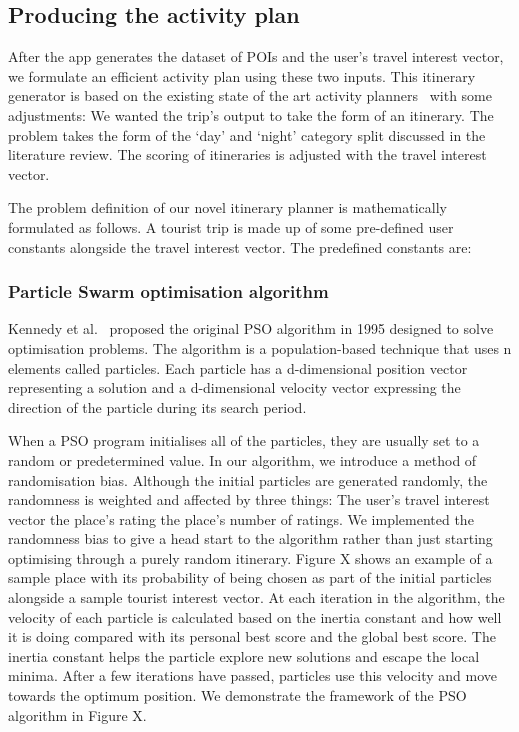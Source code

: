 
\subsection{Producing the activity plan}

After the app generates the dataset of POIs and the
user's travel interest vector, we formulate an
efficient activity plan using these two inputs. This
itinerary generator is based on the existing state of
the art activity planners~\cite{Sylejmani2017, Wisittipanich2020}
with some adjustments: We wanted the trip's output to take the
form of an itinerary.  The problem takes the form of
the `day' and `night'  category split discussed in
the literature review.  The scoring of itineraries is adjusted
with the travel interest vector.

The problem definition of our novel itinerary planner
is mathematically formulated as follows. A tourist trip is made up
of some pre-defined user constants alongside the travel interest
vector. The predefined constants are:
\\


\subsubsection{Particle Swarm optimisation algorithm}


Kennedy et al.~\cite{Kennedy} proposed the original PSO algorithm in
1995 designed to solve optimisation problems. The
algorithm is a population-based technique that uses n
elements called particles. Each particle has a
d-dimensional position vector representing a solution
and a d-dimensional velocity vector expressing the
direction of the particle during its search period. 

When a PSO program initialises all of the particles,
they are usually set to a random or predetermined
value. In our algorithm, we introduce a method of
randomisation bias. Although the initial particles are
generated randomly, the randomness is weighted and
affected by three things: The user's travel interest
vector the place's rating the place's number of
ratings.  We implemented the randomness bias to give a
head start to the algorithm rather than just starting
optimising through a purely random itinerary. Figure X
shows an example of a sample place with its
probability of being chosen as part of the initial
particles alongside a sample tourist interest vector.
At each iteration in the algorithm, the velocity of
each particle is calculated based on the inertia
constant and how well it is doing compared with its
personal best score and the global best score. The
inertia constant helps the particle explore new
solutions and escape the local minima. After a few
iterations have passed, particles use this velocity
and move towards the optimum position. We demonstrate
the framework of the PSO algorithm in Figure X.

